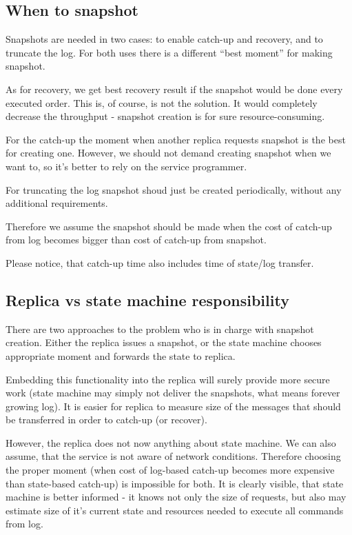 \subsection{When to snapshot}
\label{subsec:when_to_snapshot}
Snapshots are needed in two cases: to enable catch-up and recovery, and to truncate the log. For both uses there is a different ``best moment'' for making snapshot.

As for recovery, we get best recovery result if the snapshot would be done every executed order.
This is, of course, is not the solution. It would completely decrease the throughput - snapshot creation is for sure resource-consuming.

For the catch-up the moment when another replica requests snapshot is the best for creating one. However, we should not demand creating snapshot when we want to, so it's better to rely on the service programmer.

For truncating the log snapshot shoud just be created periodically, without any additional requirements.

Therefore we assume the snapshot should be made when the cost of catch-up from log becomes bigger than cost of catch-up from snapshot.

Please notice, that catch-up time also includes time of state/log transfer.

\subsection{Replica vs state machine responsibility}
\label{subsec:replica_vs_state_machine_responsibility}
There are two approaches to the problem who is in charge with snapshot creation. Either the replica issues a snapshot, or the state machine chooses appropriate moment and forwards the state to replica.

Embedding this functionality into the replica will surely provide more secure work (state machine may simply not deliver the snapshots, what means forever growing log). It is easier for replica to measure size of the messages that should be transferred in order to catch-up (or recover).

However, the replica does not now anything about state machine. We can also assume, that the service is not aware of network conditions. Therefore choosing the proper moment (when cost of log-based catch-up becomes more expensive than state-based catch-up) is impossible for both. It is clearly visible, that state machine is better informed - it knows not only the size of requests, but also may estimate size of it's current state and resources needed to execute all commands from log.

